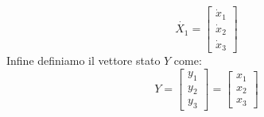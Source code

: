 \documentclass[12pt,a4paper,twoside, openright]{scrartcl}
\newcommand{\Xup}{\dot{X_1}}
\newcommand{\xu}{x_1}
\newcommand{\xd}{x_2}
\newcommand{\xt}{x_3}
\newcommand{\xup}{\dot{x}_1}
\newcommand{\xdp}{\dot{x}_2}
\newcommand{\xtp}{\dot{x}_3}
\newcommand{\yu}{y_1}
\newcommand{\yd}{y_2}
\newcommand{\yt}{y_3}
\begin{document}
\begin{equation}
	\label{eqn:11}
	\Xup =
	\begin{bmatrix}
		\xup \\
		\xdp \\
		\xtp
	\end{bmatrix}
\end{equation}
Infine definiamo il vettore stato $Y$ come:
\begin{equation}
	\label{eqn:12}
	Y=
	\begin{bmatrix}
		\yu \\
		\yd \\
		\yt
	\end{bmatrix}
	=
	\begin{bmatrix}
		\xu \\
		\xd \\
		\xt
	\end{bmatrix}
\end{equation}	
\end{document}
